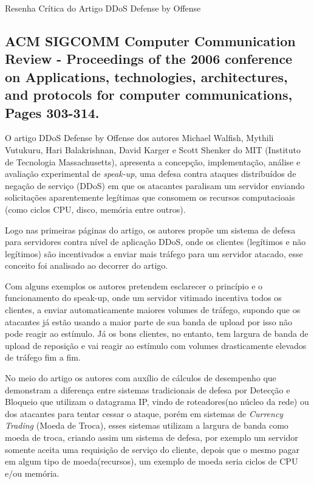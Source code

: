 \documentclass[a4paper,12pt]{article}
\begin{document}
\LARGE
Resenha Crítica do Artigo DDoS Defense by Offense
\large

\subsection*{
	 ACM SIGCOMM  Computer Communication Review - Proceedings of the 2006 conference on Applications, technologies, architectures, and protocols for computer communications, Pages 303-314.
}

\vspace{0.3cm}

 O artigo DDoS Defense by Offense \cite{Walfish:2006:DDO:1151659.1159948} dos autores Michael Walfish, Mythili Vutukuru, Hari Balakrishnan, David Karger  e  Scott Shenker do MIT (Instituto de Tecnologia Massachusetts), apresenta a concepção, implementação, análise e avaliação experimental de \textit{speak-up}, uma defesa contra ataques distribuídos de negação de serviço (DDoS) em que os atacantes paralisam um servidor enviando solicitações aparentemente legítimas que consomem os recursos computacioais (como ciclos CPU, disco, memória entre outros).


\vspace{0.3cm}

 Logo nas primeiras páginas do artigo, os autores propõe um sistema de defesa para servidores contra nível de aplicação DDoS, onde os clientes (legítimos e não legítimos) são incentivados a enviar mais tráfego para um servidor atacado, esse conceito foi analisado ao decorrer do artigo.

\vspace{0.3cm}
Com alguns exemplos os autores pretendem esclarecer o princípio e o funcionamento do speak-up, onde um servidor vitimado incentiva todos os clientes, a enviar automaticamente maiores volumes de tráfego, supondo que os atacantes já estão usando a maior parte de sua banda de upload por isso não pode reagir ao estímulo. Já os bons clientes, no entanto, tem largura de banda de upload de reposição e vai reagir ao estímulo com volumes drasticamente elevados de tráfego fim a fim.

\vspace{0.3cm}

No meio do artigo os autores com auxílio de cálculos de desempenho que demonstram a diferença entre sistemas tradicionais de defesa por Detecção e Bloqueio que utilizam o datagrama IP, vindo de roteadores(no núcleo da rede) ou dos atacantes para tentar cessar o ataque, porém em sistemas de \textit{Currency Trading} (Moeda de Troca), esses sistemas utilizam a largura de banda como moeda de troca, criando assim um sistema de defesa, por exemplo um servidor somente aceita uma requisição de serviço do cliente, depois que o mesmo pagar em algum tipo de moeda(recursos), um exemplo de moeda seria ciclos de CPU e/ou memória. 
\end{document}
